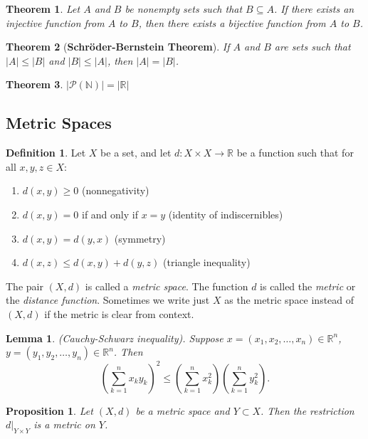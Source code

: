 \documentclass{article}
\newtheorem{theorem}{Theorem}[section]
\newtheorem{lemma}{Lemma}[section]
\newtheorem{proposition}{Proposition}[section]
\theoremstyle{definition}
\newtheorem{definition}{Definition}[section]
\theoremstyle{remark}
\begin{document}
\begin{theorem}
Let \( A \) and \( B \) be nonempty sets such that \( B \subseteq A \). If there exists an injective function from \( A \) to \( B \), then there exists a bijective function from \( A \) to \( B \).
\end{theorem}


\begin{theorem}[\textbf{Schröder-Bernstein Theorem}]
If \( A \) and \( B \) are sets such that \( |A| \leq |B| \) and \( |B| \leq |A| \), then \( |A| = |B| \).
\end{theorem}




\begin{theorem}
$|\mathcal{P}(\mathbb{N})| = |\mathbb{R}|$
\end{theorem}


\subsection{Metric Spaces}
\begin{definition} \label{def:metric_space}
Let \( X \) be a set, and let \( d: X \times X \to \mathbb{R} \) be a function such that for all \( x, y, z \in X \):
\begin{enumerate}
\item \( d(x,y) \geq 0 \) \hfill (nonnegativity)
\item \( d(x,y) = 0 \) if and only if \( x = y \) \hfill (identity of indiscernibles)
\item \( d(x,y) = d(y,x) \) \hfill (symmetry)
\item \( d(x,z) \leq d(x,y) + d(y,z) \) \hfill (triangle inequality)
\end{enumerate}
The pair \( (X, d) \) is called a \textit{metric space}. The function \( d \) is called the \textit{metric} or the \textit{distance function}. Sometimes we write just \( X \) as the metric space instead of \( (X, d) \) if the metric is clear from context.
\end{definition}

\begin{lemma} \label{lem:cauchy_schwarz}
(Cauchy-Schwarz inequality). Suppose \( x = (x_1, x_2, \dots, x_n) \in \mathbb{R}^n \), \( y = (y_1, y_2, \dots, y_n) \in \mathbb{R}^n \). Then
\[
\left( \sum_{k=1}^{n} x_k y_k \right)^2 \leq \left( \sum_{k=1}^{n} x_k^2 \right) \left( \sum_{k=1}^{n} y_k^2 \right).
\]
\end{lemma}

\begin{proposition} \label{prop:metric_restriction}
Let \( (X, d) \) be a metric space and \( Y \subset X \). Then the restriction \( d|_{Y \times Y} \) is a metric on \( Y \).
\end{proposition}
\end{document}
